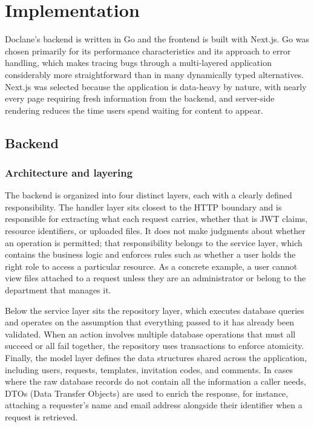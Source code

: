 \chapter{Implementation}
\label{chap:ch3}

\par Doclane's backend is written in Go and the frontend is built with Next.js. Go was chosen primarily for its performance characteristics and its approach to error handling, which makes tracing bugs through a multi-layered application considerably more straightforward than in many dynamically typed alternatives. Next.js was selected because the application is data-heavy by nature, with nearly every page requiring fresh information from the backend, and server-side rendering reduces the time users spend waiting for content to appear.

\section{Backend}

\subsection{Architecture and layering}

\par The backend is organized into four distinct layers, each with a clearly defined responsibility. The handler layer sits closest to the HTTP boundary and is responsible for extracting what each request carries, whether that is JWT claims, resource identifiers, or uploaded files. It does not make judgments about whether an operation is permitted; that responsibility belongs to the service layer, which contains the business logic and enforces rules such as whether a user holds the right role to access a particular resource. As a concrete example, a user cannot view files attached to a request unless they are an administrator or belong to the department that manages it.

\par Below the service layer sits the repository layer, which executes database queries and operates on the assumption that everything passed to it has already been validated. When an action involves multiple database operations that must all succeed or all fail together, the repository uses transactions to enforce atomicity. Finally, the model layer defines the data structures shared across the application, including users, requests, templates, invitation codes, and comments. In cases where the raw database records do not contain all the information a caller needs, DTOs (Data Transfer Objects) are used to enrich the response, for instance, attaching a requester's name and email address alongside their identifier when a request is retrieved.


